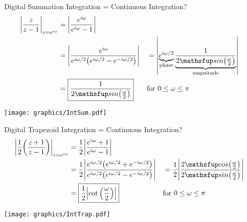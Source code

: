 \newpage\mbox{}\vfill
\vfill
Digital Summation Integration = Continuous Integration?
\vfill
\begin{align*}
  \abs{\frac{z}{z-1}}_{z=e^{i\omega}}
    &= \abs{\frac{e^{i\omega}}{e^{i\omega}-1}}
  \\&= \abs{\frac{e^{i\omega}}{e^{i\omega/2}\brp{e^{i\omega/2}-e^{-i\omega/2}}}}
   &&= \abs{\mcom{e^{i\omega/2}}{phase}\,\mcom{\frac{1}{2\sin\brp{\frac{\omega}{2}}}}{magnitude}}
  \\&= \boxed{\frac{1}{2\sin\brp{\frac{\omega}{2}}}} 
    && \text{for $0\le\omega\le\pi$}
\end{align*}
\vfill\mbox{}

\newpage\mbox{}\vfill
\texttt{[image: graphics/IntSum.pdf]}
\vfill\mbox{}

\newpage\mbox{}\vfill
\vfill
Digital Trapezoid Integration = Continuous Integration?
\vfill
\begin{align*}
  \abs{\frac{1}{2}\brp{\frac{z+1}{z-1}}}_{z=e^{i\omega}}
    &= \frac{1}{2}
       \abs{\frac{e^{i\omega}+1}{e^{i\omega}-1}}
  \\&= \frac{1}{2}
       \abs{\frac{e^{i\omega/2}\brp{e^{i\omega/2}+e^{-i\omega/2}}}
                 {e^{i\omega/2}\brp{e^{i\omega/2}-e^{-i\omega/2}}}
           }
   &&= \frac{1}{2}
       \abs{\frac{2\cos\brp{\frac{\omega}{2}}}
                 {2\sin\brp{\frac{\omega}{2}}}
           }
  \\&= \boxed{\frac{1}{2} \abs{\cot\brp{\frac{\omega}{2}}}}
    && \text{for $0\le\omega\le\pi$}
\end{align*}
\vfill\mbox{}

\newpage\mbox{}\vfill
\texttt{[image: graphics/IntTrap.pdf]}
\vfill\mbox{}

\newpage\mbox{}\vfill

\vfill\mbox{}

\newpage\mbox{}\vfill

\vfill\mbox{}



